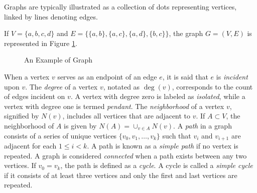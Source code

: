 Graphs are typically illustrated as a collection of dots representing vertices, linked by lines denoting edges.

\begin{example}
\label{ex:binary_tree}
If $V=\{a, b, c, d\}$ and $E=\{ \{a,b\}, \{a,c\}, \{a,d\}, \{b,c\} \}$, the graph $G=(V,E)$ is represented in Figure \ref{fig:Graph-Example}.
\end{example}

\begin{figure}[t]
\centering
{}
\caption{\label{fig:Graph-Example}An Example of Graph}
\end{figure}

When a vertex $v$ serves as an endpoint of an edge $e$, it is said that $e$ is \emph{incident} upon $v$. The \emph{degree} of a vertex $v$, notated as $\deg(v)$, corresponds to the count of edges incident on $v$. A vertex with degree zero is labeled as \emph{isolated}, while a vertex with degree one is termed \emph{pendant}. The \emph{neighborhood} of a vertex $v$, signified by $N(v)$, includes all vertices that are adjacent to $v$. If $A \subset V$, the neighborhood of $A$ is given by $N(A) = \cup_{v \in A} N(v)$. A \emph{path} in a graph consists of a series of unique vertices $\{v_{0}, v_{1}, \ldots ,v_{k}\}$ such that $v_{i}$ and $v_{i+1}$ are adjacent for each $1 \leq i < k$. A path is known as a \emph{simple path} if no vertex is repeated. A graph is considered \emph{connected} when a path exists between any two vertices. If $v_{0} = v_{k}$, the path is defined as a \emph{cycle}. A cycle is called a \emph{simple cycle} if it consists of at least three vertices and only the first and last vertices are repeated. 

